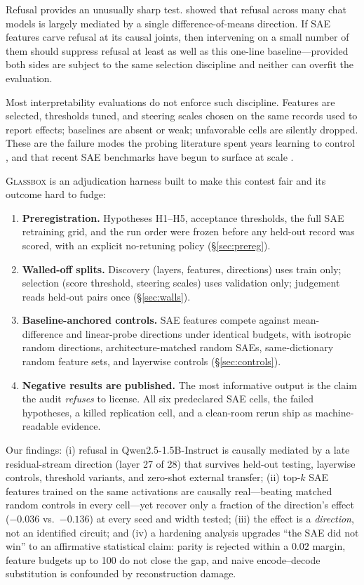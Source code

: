 \documentclass[11pt]{article}
\newcommand{\glassbox}{\textsc{Glassbox}}
\begin{document}
Refusal provides an unusually sharp test.  \citet{arditi2024refusal} showed
that refusal across many chat models is largely mediated by a single
difference-of-means direction.  If SAE features carve refusal at its causal
joints, then intervening on a small number of them should suppress refusal at
least as well as this one-line baseline---provided both sides are subject to
the same selection discipline and neither can overfit the evaluation.

Most interpretability evaluations do not enforce such discipline.  Features
are selected, thresholds tuned, and steering scales chosen on the same records
used to report effects; baselines are absent or weak; unfavorable cells are
silently dropped.  These are the failure modes the probing literature spent
years learning to control \citep{hewitt2019designing,belinkov2022probing},
and that recent SAE benchmarks have begun to surface at scale
\citep{wu2025axbench,karvonen2025saebench,heap2025automated}.

\glassbox{} is an adjudication harness built to make this contest fair and its
outcome hard to fudge:

\begin{enumerate}
\item \textbf{Preregistration.}  Hypotheses H1--H5, acceptance thresholds, the
  full SAE retraining grid, and the run order were frozen before any held-out
  record was scored, with an explicit no-retuning policy
  (\S\ref{sec:prereg}).
\item \textbf{Walled-off splits.}  Discovery (layers, features, directions)
  uses train only; selection (score threshold, steering scales) uses
  validation only; judgement reads held-out pairs once
  (\S\ref{sec:walls}).
\item \textbf{Baseline-anchored controls.}  SAE features compete against
  mean-difference and linear-probe directions under identical budgets, with
  isotropic random directions, architecture-matched random SAEs,
  same-dictionary random feature sets, and layerwise controls
  (\S\ref{sec:controls}).
\item \textbf{Negative results are published.}  The most informative output is
  the claim the audit \emph{refuses} to license.  All six predeclared SAE
  cells, the failed hypotheses, a killed replication cell, and a clean-room
  rerun ship as machine-readable evidence.
\end{enumerate}

\noindent Our findings: (i) refusal in Qwen2.5-1.5B-Instruct is causally
mediated by a late residual-stream direction (layer 27 of 28) that survives
held-out testing, layerwise controls, threshold variants, and zero-shot
external transfer; (ii) top-$k$ SAE features trained on the same activations
are causally real---beating matched random controls in every cell---yet
recover only a fraction of the direction's effect ($-0.036$ vs.\ $-0.136$) at
every seed and width tested; (iii) the effect is a \emph{direction}, not an
identified circuit; and (iv) a hardening analysis upgrades ``the SAE did not
win'' to an affirmative statistical claim: parity is rejected within a
$0.02$ margin, feature budgets up to 100 do not close the gap, and naive
encode--decode substitution is confounded by reconstruction damage.
\end{document}
